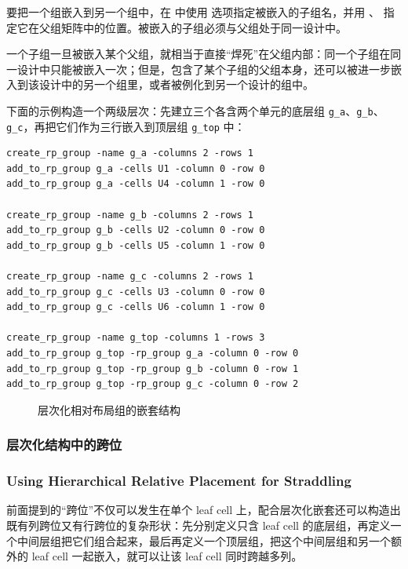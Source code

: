 要把一个组嵌入到另一个组中，在  中使用  选项指定被嵌入的子组名，并用 、 指定它在父组矩阵中的位置。被嵌入的子组必须与父组处于同一设计中。

一个子组一旦被嵌入某个父组，就相当于直接“焊死”在父组内部：同一个子组在同一设计中只能被嵌入一次；但是，包含了某个子组的父组本身，还可以被进一步嵌入到该设计中的另一个组里，或者被例化到另一个设计的组中。

下面的示例构造一个两级层次：先建立三个各含两个单元的底层组 \texttt{g\_a}、\texttt{g\_b}、\texttt{g\_c}，再把它们作为三行嵌入到顶层组 \texttt{g\_top} 中：
\begin{lstlisting}
create_rp_group -name g_a -columns 2 -rows 1
add_to_rp_group g_a -cells U1 -column 0 -row 0
add_to_rp_group g_a -cells U4 -column 1 -row 0

create_rp_group -name g_b -columns 2 -rows 1
add_to_rp_group g_b -cells U2 -column 0 -row 0
add_to_rp_group g_b -cells U5 -column 1 -row 0

create_rp_group -name g_c -columns 2 -rows 1
add_to_rp_group g_c -cells U3 -column 0 -row 0
add_to_rp_group g_c -cells U6 -column 1 -row 0

create_rp_group -name g_top -columns 1 -rows 3
add_to_rp_group g_top -rp_group g_a -column 0 -row 0
add_to_rp_group g_top -rp_group g_b -column 0 -row 1
add_to_rp_group g_top -rp_group g_c -column 0 -row 2
\end{lstlisting}

\begin{figure}[htbp]
\centering
{}
\caption{层次化相对布局组的嵌套结构}
\label{fig:rp-hier}
\end{figure}

\subsubsection{层次化结构中的跨位}
\subsubsection*{Using Hierarchical Relative Placement for Straddling}

前面提到的“跨位”不仅可以发生在单个 leaf cell 上，配合层次化嵌套还可以构造出既有列跨位又有行跨位的复杂形状：先分别定义只含 leaf cell 的底层组，再定义一个中间层组把它们组合起来，最后再定义一个顶层组，把这个中间层组和另一个额外的 leaf cell 一起嵌入，就可以让该 leaf cell 同时跨越多列。

